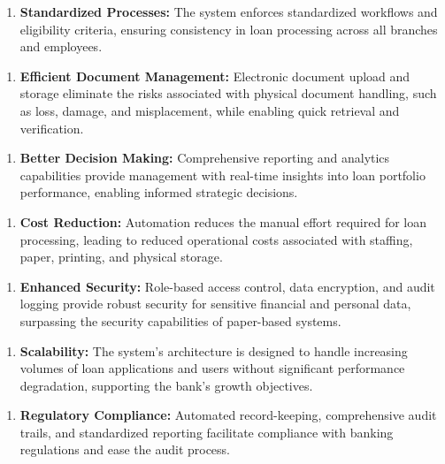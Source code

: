 \documentclass[12pt,a4paper,oneside]{report}
\begin{document}
\begin{enumerate}
  \item \textbf{Standardized Processes:} The system enforces standardized workflows and eligibility criteria, ensuring consistency in loan processing across all branches and employees.
\end{enumerate}

\begin{enumerate}
  \item \textbf{Efficient Document Management:} Electronic document upload and storage eliminate the risks associated with physical document handling, such as loss, damage, and misplacement, while enabling quick retrieval and verification.
\end{enumerate}

\begin{enumerate}
  \item \textbf{Better Decision Making:} Comprehensive reporting and analytics capabilities provide management with real-time insights into loan portfolio performance, enabling informed strategic decisions.
\end{enumerate}

\begin{enumerate}
  \item \textbf{Cost Reduction:} Automation reduces the manual effort required for loan processing, leading to reduced operational costs associated with staffing, paper, printing, and physical storage.
\end{enumerate}

\begin{enumerate}
  \item \textbf{Enhanced Security:} Role-based access control, data encryption, and audit logging provide robust security for sensitive financial and personal data, surpassing the security capabilities of paper-based systems.
\end{enumerate}

\begin{enumerate}
  \item \textbf{Scalability:} The system's architecture is designed to handle increasing volumes of loan applications and users without significant performance degradation, supporting the bank's growth objectives.
\end{enumerate}

\begin{enumerate}
  \item \textbf{Regulatory Compliance:} Automated record-keeping, comprehensive audit trails, and standardized reporting facilitate compliance with banking regulations and ease the audit process.
\end{enumerate}
\end{document}
